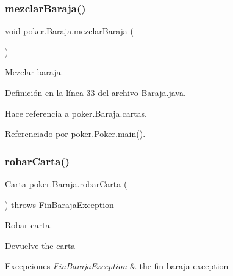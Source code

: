\subsubsection{\texorpdfstring{mezclarBaraja()}{mezclarBaraja()}}
{\footnotesize\ttfamily void poker.\+Baraja.\+mezclar\+Baraja (\begin{DoxyParamCaption}{ }\end{DoxyParamCaption})}



Mezclar baraja. 



Definición en la línea 33 del archivo Baraja.\+java.


\begin{DoxyCode}{0}

\end{DoxyCode}


Hace referencia a poker.\+Baraja.\+cartas.



Referenciado por poker.\+Poker.\+main().

\mbox{\label{classpoker_1_1Baraja_a2eaf33a7d657fb1f5181d0c5307c300b}} 
\subsubsection{\texorpdfstring{robarCarta()}{robarCarta()}}
{\footnotesize\ttfamily \mbox{\hyperlink{classpoker_1_1Carta}{Carta}} poker.\+Baraja.\+robar\+Carta (\begin{DoxyParamCaption}{ }\end{DoxyParamCaption}) throws \mbox{\hyperlink{classpoker_1_1FinBarajaException}{Fin\+Baraja\+Exception}}}



Robar carta. 

\begin{DoxyReturn}{Devuelve}
the carta 
\end{DoxyReturn}

\begin{DoxyExceptions}{Excepciones}
{\em \mbox{\hyperlink{classpoker_1_1FinBarajaException}{Fin\+Baraja\+Exception}}} & the fin baraja exception \\
\hline
\end{DoxyExceptions}



